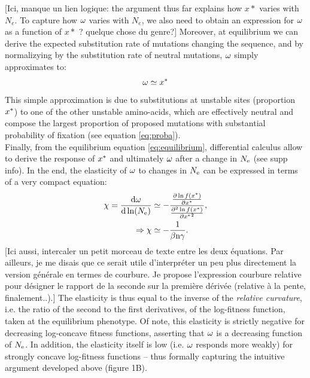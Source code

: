 \documentclass{article}
\begin{document}
	[Ici, manque un lien logique: the argument thus far explains how $x*$ varies with $N_e$. To capture how $\omega$ varies with $N_e$, we also need to obtain an expression for $\omega$ as a function of $x*$ ? quelque chose du genre?] Moreover, at equilibrium we can derive the expected substitution rate of mutations changing the sequence, and by normalizying by the substitution rate of neutral mutations, $\omega$ simply approximates to:
	\begin{gather}
	\omega \simeq x^{*} \label{eq:dnds}
	\end{gather}
	This simple approximation is due to substitutions at unstable sites (proportion $x^{*}$) to one of the other unstable amino-acids, which are effectively neutral and compose the largest proportion of proposed mutations with substantial probability of fixation (see equation \ref{eq:proba}).\\
	
	Finally, from the equilibrium equation \ref{eq:equilibrium}, differential calculus allow to derive the response of $x^{*}$ and ultimately $\omega$ after a change in $N_{\mathrm{e}}$ (see supp info).
	In the end, the elasticity of $\omega$ to changes in $N_{\mathrm{e}}$ can be expressed in terms of a very compact equation: 
	\begin{align}
	\chi = \frac{ \mathrm{d} \omega}{\mathrm{d} \ln (N_{\mathrm{e}})} & \simeq - \frac{\frac{ \partial \ln f(x^{*}) }{\partial {x^{*}}}}{\frac{ \partial^2 \ln f(x^{*}) }{\partial {x^{*}}^2}}, \\
	\Rightarrow \chi & \simeq -\dfrac{1}{\beta \text{n} \gamma}.
	\end{align}
	[Ici aussi, intercaler un petit morceau de texte entre les deux équations. Par ailleurs, je me disais que ce serait utile d'interpréter un peu plus directement la version générale en termes de courbure. Je propose l'expression courbure relative pour désigner le rapport de la seconde sur la première dérivée (relative à la pente, finalement..).]
	The elasticity is thus equal to the inverse of the \emph{relative curvature}, i.e. the ratio of the second to the first derivatives, of the log-fitness function, taken at the equilibrium phenotype. Of note, this elasticity is strictly negative for decreasing log-concave fitness functions, asserting that $\omega$ is a decreasing function of $N_{\mathrm{e}}$. In addition, the elasticity itself is low (i.e. $\omega$ responds more weakly) for strongly concave log-fitness functions -- thus formally capturing the intuitive argument developed above (figure 1B).
	
\end{document}
